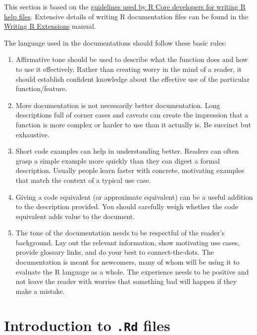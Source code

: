 \documentclass[
  letterpaper,
  DIV=11,
  numbers=noendperiod]{scrreprt}
\begin{document}
This section is based on the
\href{https://developer.r-project.org/Rds.html}{guidelines used by R
Core developers for writing R help files}. Extensive details of writing
R documentation files can be found in the
\href{https://cran.r-project.org/doc/manuals/r-release/R-exts.html\#Writing-R-documentation-files}{Writing
R Extensions} manual.

The language used in the documentations should follow these basic rules:

\begin{enumerate}
\def\labelenumi{\arabic{enumi}.}
\item
  Affirmative tone should be used to describe what the function does and
  how to use it effectively. Rather than creating worry in the mind of a
  reader, it should establish confident knowledge about the effective
  use of the particular function/feature.
\item
  More documentation is not necessarily better documentation. Long
  descriptions full of corner cases and caveats can create the
  impression that a function is more complex or harder to use than it
  actually is. Be succinct but exhaustive.
\item
  Short code examples can help in understanding better. Readers can
  often grasp a simple example more quickly than they can digest a
  formal description. Usually people learn faster with concrete,
  motivating examples that match the context of a typical use case.
\item
  Giving a code equivalent (or approximate equivalent) can be a useful
  addition to the description provided. You should carefully weigh
  whether the code equivalent adds value to the document.
\item
  The tone of the documentation needs to be respectful of the reader's
  background. Lay out the relevant information, show motivating use
  cases, provide glossary links, and do your best to connect-the-dots.
  The documentation is meant for newcomers, many of whom will be using
  it to evaluate the R language as a whole. The experience needs to be
  positive and not leave the reader with worries that something bad will
  happen if they make a mistake.
\end{enumerate}

\section{\texorpdfstring{Introduction to \texttt{.Rd}
files}{Introduction to .Rd files}}\label{introduction-to-.rd-files}
\end{document}
